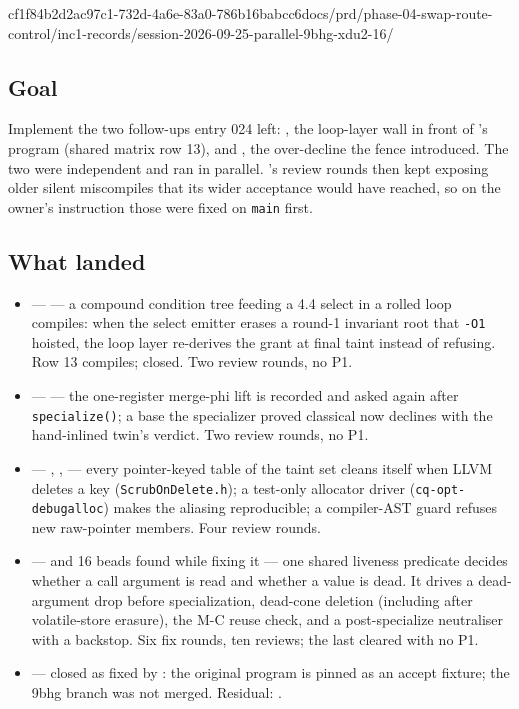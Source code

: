 %
  {cf1f84b2}{d2ac97c1-732d-4a6e-83a0-786b16babcc6}{docs/prd/phase-04-swap-route-control/inc1-records/session-2026-09-25-parallel-9bhg-xdu2-16/}

\subsection*{Goal}
Implement the two follow-ups entry 024 left: , the loop-layer wall
in front of 's program (shared matrix row 13), and , the
over-decline the  fence introduced. The two were independent and ran
in parallel. 's review rounds then kept exposing older silent
miscompiles that its wider acceptance would have reached, so on the owner's
instruction those were fixed on \texttt{main} first.

\subsection*{What landed}
\begin{itemize}
  \item {} ---  --- a compound condition tree feeding a
    4.4 select in a rolled loop compiles: when the select emitter erases a
    round-1 invariant root that \texttt{-O1} hoisted, the loop layer re-derives
    the grant at final taint instead of refusing. Row 13 compiles; 
    closed. Two review rounds, no P1.
  \item {} ---  --- the one-register merge-phi lift is
    recorded and asked again after \texttt{specialize()}; a base the specializer
    proved classical now declines with the hand-inlined twin's verdict. Two
    review rounds, no P1.
  \item {} --- , ,  --- every
    pointer-keyed table of the taint set cleans itself when LLVM deletes a key
    (\texttt{ScrubOnDelete.h}); a test-only allocator driver
    (\texttt{cq-opt-debugalloc}) makes the aliasing reproducible; a
    compiler-AST guard refuses new raw-pointer members. Four review rounds.
  \item {} ---  and 16 beads found while fixing it ---
    one shared liveness predicate decides whether a call argument is read and
    whether a value is dead. It drives a dead-argument drop before
    specialization, dead-cone deletion (including after volatile-store
    erasure), the M-C reuse check, and a post-specialize neutraliser with a
    backstop. Six fix rounds, ten reviews; the last cleared with no P1.
  \item {} ---  closed as fixed by : the
    original program is pinned as an accept fixture; the 9bhg branch was not
    merged. Residual: .
\end{itemize}

